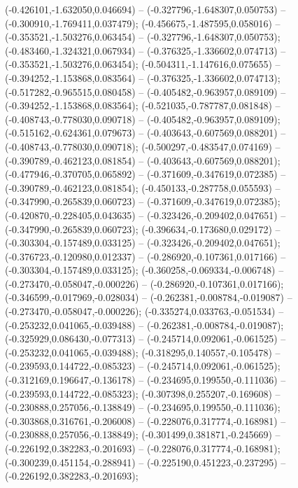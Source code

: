  (-0.426101,-1.632050,0.046694) -- (-0.327796,-1.648307,0.050753) -- (-0.300910,-1.769411,0.037479);
 (-0.456675,-1.487595,0.058016) -- (-0.353521,-1.503276,0.063454) -- (-0.327796,-1.648307,0.050753);
 (-0.483460,-1.324321,0.067934) -- (-0.376325,-1.336602,0.074713) -- (-0.353521,-1.503276,0.063454);
 (-0.504311,-1.147616,0.075655) -- (-0.394252,-1.153868,0.083564) -- (-0.376325,-1.336602,0.074713);
 (-0.517282,-0.965515,0.080458) -- (-0.405482,-0.963957,0.089109) -- (-0.394252,-1.153868,0.083564);
 (-0.521035,-0.787787,0.081848) -- (-0.408743,-0.778030,0.090718) -- (-0.405482,-0.963957,0.089109);
 (-0.515162,-0.624361,0.079673) -- (-0.403643,-0.607569,0.088201) -- (-0.408743,-0.778030,0.090718);
 (-0.500297,-0.483547,0.074169) -- (-0.390789,-0.462123,0.081854) -- (-0.403643,-0.607569,0.088201);
 (-0.477946,-0.370705,0.065892) -- (-0.371609,-0.347619,0.072385) -- (-0.390789,-0.462123,0.081854);
 (-0.450133,-0.287758,0.055593) -- (-0.347990,-0.265839,0.060723) -- (-0.371609,-0.347619,0.072385);
 (-0.420870,-0.228405,0.043635) -- (-0.323426,-0.209402,0.047651) -- (-0.347990,-0.265839,0.060723);
 (-0.396634,-0.173680,0.029172) -- (-0.303304,-0.157489,0.033125) -- (-0.323426,-0.209402,0.047651);
 (-0.376723,-0.120980,0.012337) -- (-0.286920,-0.107361,0.017166) -- (-0.303304,-0.157489,0.033125);
 (-0.360258,-0.069334,-0.006748) -- (-0.273470,-0.058047,-0.000226) -- (-0.286920,-0.107361,0.017166);
 (-0.346599,-0.017969,-0.028034) -- (-0.262381,-0.008784,-0.019087) -- (-0.273470,-0.058047,-0.000226);
 (-0.335274,0.033763,-0.051534) -- (-0.253232,0.041065,-0.039488) -- (-0.262381,-0.008784,-0.019087);
 (-0.325929,0.086430,-0.077313) -- (-0.245714,0.092061,-0.061525) -- (-0.253232,0.041065,-0.039488);
 (-0.318295,0.140557,-0.105478) -- (-0.239593,0.144722,-0.085323) -- (-0.245714,0.092061,-0.061525);
 (-0.312169,0.196647,-0.136178) -- (-0.234695,0.199550,-0.111036) -- (-0.239593,0.144722,-0.085323);
 (-0.307398,0.255207,-0.169608) -- (-0.230888,0.257056,-0.138849) -- (-0.234695,0.199550,-0.111036);
 (-0.303868,0.316761,-0.206008) -- (-0.228076,0.317774,-0.168981) -- (-0.230888,0.257056,-0.138849);
 (-0.301499,0.381871,-0.245669) -- (-0.226192,0.382283,-0.201693) -- (-0.228076,0.317774,-0.168981);
 (-0.300239,0.451154,-0.288941) -- (-0.225190,0.451223,-0.237295) -- (-0.226192,0.382283,-0.201693);
